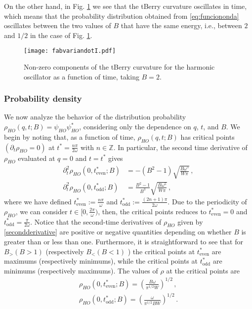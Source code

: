 \documentclass[12pt]{iopart}
\begin{document}
On the other hand, in Fig. \ref{berryo2} we see that the tBerry curvature oscillates in time, which means that the probability distribution obtained from \eqref{eq:funciononda} oscillates between the two values of $B$ that have the same energy, i.e., between $2$ and $1/2$ in the case of Fig. \ref{berryo2}. 

\begin{figure}[H]
    \centering
    \texttt{[image: fabvariandotI.pdf]}
    \captionsetup{font=small} 
    \caption{\justifying Non-zero components of the tBerry curvature for the harmonic oscillator as a function of time, taking $B=2$. }
    \label{berryo2}
\end{figure}

\subsubsection{Probability density}

We now analyze the behavior of the distribution probability $\rho_{HO}(q,t;B)=\psi_{HO} \psi^*_{HO}$, considering only the dependence on $q$, $t$, and $B$.  We begin by noting that, as a function of time, $\rho_{HO}(q,t;B)$ has critical points $(\partial_t\rho_{HO}=0)$ at $t^*=\tfrac{n\pi}{2\omega}$ with $n \in \mathbb{Z}$. In particular, the second time derivative of $\rho_{HO}$ evaluated at $q=0$ and  $t=t^*$ gives
\begin{subequations}\label{secondderivative}
\begin{align}
\partial^2_t\rho_{HO}(0,t^*_{\text{even}};B)&=-(B^2-1)\sqrt{\frac{B\omega^{5}}{W\pi}}\,,\\
     \partial^2_t\rho_{HO}(0,t^*_{\text{odd}};B)&=\frac{B^2-1}{B^3}\sqrt{\frac{B\omega^{5}}{W\pi}}\,,   
\end{align}
\end{subequations}
where we have defined $t^*_{\text{even}}:=\tfrac{n\pi}{\omega}$ and $t^*_{\text{odd}}:=\tfrac{(2n+1)\pi}{2\omega}$. Due to the periodicity of $\rho_{HO}$, we can consider $t\in [0,\tfrac{2\pi}{\omega})$, then, the critical points reduces to $t^*_{\text{even}}=0$  and $t^*_{\text{odd}}=\tfrac{\pi}{2\omega}$. Notice that the second-time derivatives of $\rho_{HO}$ given by \eqref{secondderivative} are positive or negative quantities depending on whether $B$ is greater than or less than one. Furthermore, it is straightforward to see that for $B_> (B>1)$ (respectively $B_< (B<1) $ ) the critical points at $t^*_{\text{even}}$ are maximums (respectively minimums), while the critical points at $t^*_{\text{odd}}$ are minimums (respectively maximums). The values of $\rho$ at the critical points are 
\begin{subequations}
    \begin{align}
    \rho_{HO}(0,t^*_{\text{even}};B)=\left(\frac{B \omega}{\pi^{1/2} W} \right)^{1/2}\,,\\
    \rho_{HO}(0,t^*_{\text{odd}};B)=\left(\frac{\omega}{\pi^{1/2} B W} \right)^{1/2}\,.
    \end{align}
\end{subequations}
\end{document}
